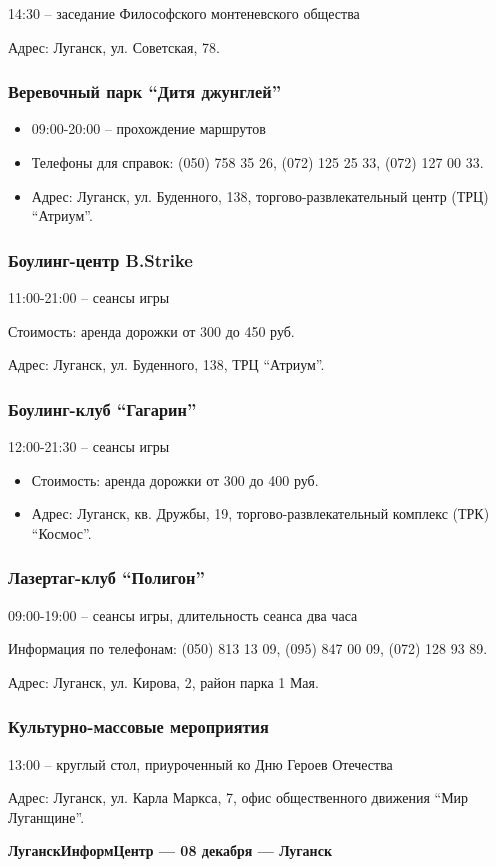 14:30 – заседание Философского монтеневского общества

Адрес: Луганск, ул. Советская, 78.

\subsubsection{Веревочный парк \enquote{Дитя джунглей}}

\begin{itemize}
  \item 09:00-20:00 – прохождение маршрутов
  \item Телефоны для справок: (050) 758 35 26, (072) 125 25 33, (072) 127 00 33. 
  \item Адрес: Луганск, ул. Буденного, 138, торгово-развлекательный центр (ТРЦ) \enquote{Атриум}.
\end{itemize}

\subsubsection{Боулинг-центр B.Strike}

11:00-21:00 – сеансы игры

Стоимость: аренда дорожки от 300 до 450 руб.

Адрес: Луганск, ул. Буденного, 138, ТРЦ \enquote{Атриум}.

\subsubsection{Боулинг-клуб \enquote{Гагарин}}

12:00-21:30 – сеансы игры

\begin{itemize}
  \item Стоимость: аренда дорожки от 300 до 400 руб.
  \item Адрес: Луганск, кв. Дружбы, 19, торгово-развлекательный комплекс (ТРК) \enquote{Космос}.
\end{itemize}

\subsubsection{Лазертаг-клуб \enquote{Полигон}}

09:00-19:00 – сеансы игры, длительность сеанса два часа

Информация по телефонам: (050) 813 13 09, (095) 847 00 09, (072) 128 93 89.

Адрес: Луганск, ул. Кирова, 2, район парка 1 Мая.

\subsubsection{Культурно-массовые мероприятия}

13:00 – круглый стол, приуроченный ко Дню Героев Отечества

Адрес: Луганск, ул. Карла Маркса, 7, офис общественного движения \enquote{Мир Луганщине}.

\textbf{ЛуганскИнформЦентр — 08 декабря — Луганск}

